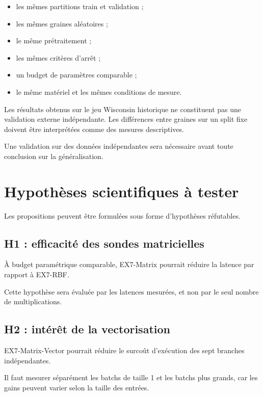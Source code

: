 \documentclass[11pt,a4paper]{article}
\begin{document}
\begin{itemize}
  \item les mêmes partitions train et validation ;
  \item les mêmes graines aléatoires ;
  \item le même prétraitement ;
  \item les mêmes critères d'arrêt ;
  \item un budget de paramètres comparable ;
  \item le même matériel et les mêmes conditions de mesure.
\end{itemize}

Les résultats obtenus sur le jeu Wisconsin historique
ne constituent pas une validation externe indépendante.
Les différences entre graines sur un split fixe doivent
être interprétées comme des mesures descriptives.

Une validation sur des données indépendantes sera nécessaire
avant toute conclusion sur la généralisation.

\section{Hypothèses scientifiques à tester}

Les propositions peuvent être formulées sous forme
d'hypothèses réfutables.

\subsection*{H1 : efficacité des sondes matricielles}

À budget paramétrique comparable, EX7-Matrix pourrait
réduire la latence par rapport à EX7-RBF.

Cette hypothèse sera évaluée par les latences mesurées,
et non par le seul nombre de multiplications.

\subsection*{H2 : intérêt de la vectorisation}

EX7-Matrix-Vector pourrait réduire le surcoût d'exécution
des sept branches indépendantes.

Il faut mesurer séparément les batchs de taille 1 et les
batchs plus grands, car les gains peuvent varier selon
la taille des entrées.
\end{document}
